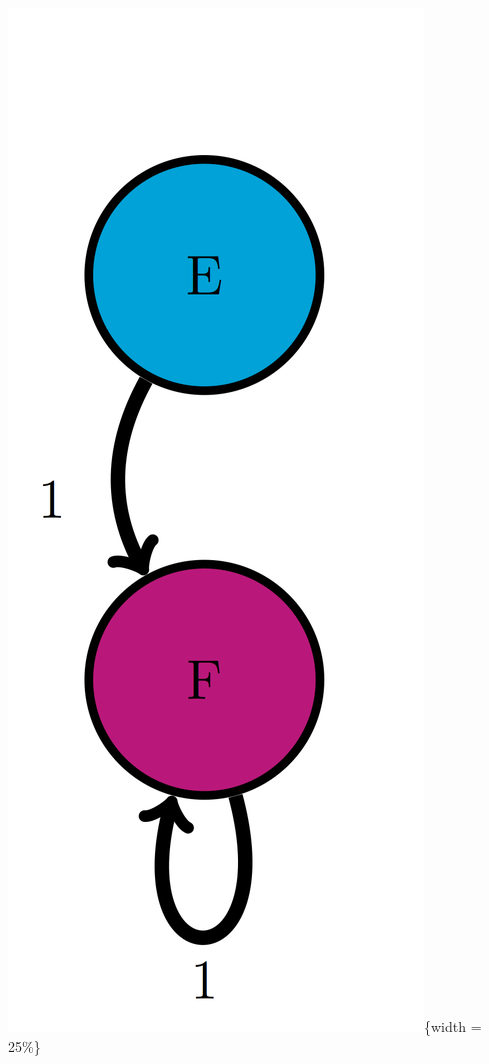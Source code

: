 \documentclass[
]{book}
\theoremstyle{definition}
\theoremstyle{definition}
\theoremstyle{definition}
\theoremstyle{remark}
\begin{document}
\includegraphics{ch10/EF_trans_diag.png}\{width = 25\%\}
\end{document}

